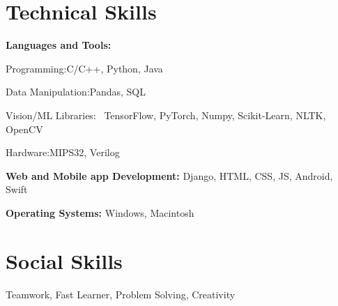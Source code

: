 \documentclass[11pt,line,margin]{resume}
\edef\hc{\string:}
\begin{document}
\begin{resume}
\section{\sc Technical Skills}


\begin{list1}
\item[] \textbf {Languages and Tools\hc} 
\begin {list2}
\item Programming\hc \space C/C++, Python, Java
\item Data Manipulation\hc \space Pandas, SQL
\item Vision/ML Libraries\hc ~ TensorFlow, PyTorch, Numpy, Scikit-Learn, NLTK, OpenCV
\item  Hardware\hc \space MIPS32, Verilog
\end{list2}
\item[] \textbf{Web and Mobile app Development\hc}  Django, HTML, CSS, JS, Android, Swift
\item[] \textbf{Operating Systems\hc}  Windows, Macintosh
\end{list1}
\newpage
\section{\sc Social Skills}
\begin{list1}
\item[] Teamwork,  Fast Learner,  Problem Solving, Creativity
\end{list1}





\end{resume}
\end{document}

